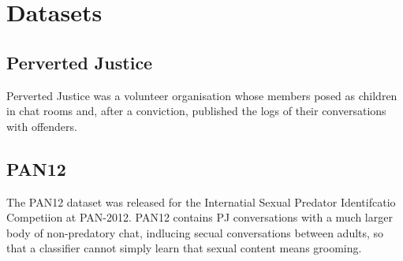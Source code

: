 \chapter{Datasets}
\label{chapter:datasets}

\section{Perverted Justice}
Perverted Justice was a volunteer organisation whose members posed as children in chat rooms and, after a conviction, published the logs of their conversations with offenders. 

\section{PAN12}
The PAN12 dataset was released for the Internatial Sexual Predator Identifcatio Competiion at PAN-2012. PAN12 contains PJ conversations with a much larger body of non-predatory chat, indlucing secual conversations between adults, so that a classifier cannot simply learn that sexual content means grooming. 